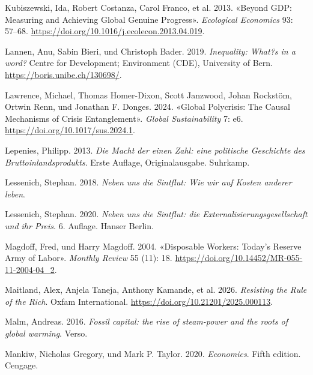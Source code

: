 \documentclass[
  nswissgerman,
  a4paper,
  DIV=11,
  numbers=noendperiod,
  oneside,
  openany]{scrreprt}
\newlength{\cslhangindent}
\newenvironment{CSLReferences}[2] %
 {\begin{list}{}{%
  \setlength{\itemindent}{0pt}
  \setlength{\leftmargin}{0pt}
  \setlength{\parsep}{0pt}
  \ifodd #1
   \setlength{\leftmargin}{\cslhangindent}
   \setlength{\itemindent}{-1\cslhangindent}
  \fi
  \setlength{\itemsep}{#2\baselineskip}}}
 {\end{list}}
\begin{document}
\begin{CSLReferences}{1}{1}
Kubiszewski, Ida, Robert Costanza, Carol Franco, et al. 2013. {«Beyond
GDP: Measuring and Achieving Global Genuine Progress»}. \emph{Ecological
Economics} 93: 57--68.
\url{https://doi.org/10.1016/j.ecolecon.2013.04.019}.

Lannen, Anu, Sabin Bieri, und Christoph Bader. 2019. \emph{Inequality:
What?s in a word?} Centre for Development; Environment (CDE), University
of Bern. \url{https://boris.unibe.ch/130698/}.

Lawrence, Michael, Thomas Homer-Dixon, Scott Janzwood, Johan Rockstöm,
Ortwin Renn, und Jonathan F. Donges. 2024. {«Global Polycrisis: The
Causal Mechanisms of Crisis Entanglement»}. \emph{Global Sustainability}
7: e6. \url{https://doi.org/10.1017/sus.2024.1}.

Lepenies, Philipp. 2013. \emph{Die Macht der einen Zahl: eine politische
Geschichte des Bruttoinlandsprodukts}. Erste Auflage, Originalausgabe.
Suhrkamp.

Lessenich, Stephan. 2018. \emph{Neben uns die Sintflut: Wie wir auf
Kosten anderer leben}.

Lessenich, Stephan. 2020. \emph{Neben uns die Sintflut: die
Externalisierungsgesellschaft und ihr Preis}. 6. Auflage. Hanser Berlin.

Magdoff, Fred, und Harry Magdoff. 2004. {«Disposable Workers: Today's
Reserve Army of Labor»}. \emph{Monthly Review} 55 (11): 18.
\url{https://doi.org/10.14452/MR-055-11-2004-04_2}.

Maitland, Alex, Anjela Taneja, Anthony Kamande, et al. 2026.
\emph{Resisting the {Rule} of the {Rich}}. Oxfam International.
\url{https://doi.org/10.21201/2025.000113}.

Malm, Andreas. 2016. \emph{Fossil capital: the rise of steam-power and
the roots of global warming}. Verso.

Mankiw, Nicholas Gregory, und Mark P. Taylor. 2020. \emph{Economics}.
Fifth edition. Cengage.


\end{CSLReferences}
\end{document}
